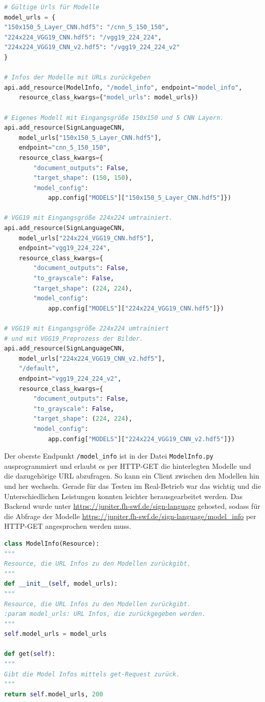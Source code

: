 \documentclass[11pt,bibliography=totocnumbered]{scrartcl}
\begin{document}
\begin{lstlisting}[language=python,firstnumber=6,caption={Anlegen der HTTP-Endpunkte.},label=lst:add_http_endpoints]
# Gültige Urls für Modelle
model_urls = {
"150x150_5_Layer_CNN.hdf5": "/cnn_5_150_150",
"224x224_VGG19_CNN.hdf5": "/vgg19_224_224",
"224x224_VGG19_CNN_v2.hdf5": "/vgg19_224_224_v2"
}

# Infos der Modelle mit URLs zurückgeben
api.add_resource(ModelInfo, "/model_info", endpoint="model_info", 
	resource_class_kwargs={"model_urls": model_urls})

# Eigenes Modell mit Eingangsgröße 150x150 und 5 CNN Layern.
api.add_resource(SignLanguageCNN, 
	model_urls["150x150_5_Layer_CNN.hdf5"], 
	endpoint="cnn_5_150_150",
	resource_class_kwargs={
		"document_outputs": False,
		"target_shape": (150, 150),
		"model_config": 
			app.config["MODELS"]["150x150_5_Layer_CNN.hdf5"]})

# VGG19 mit Eingangsgröße 224x224 umtrainiert.
api.add_resource(SignLanguageCNN, 
	model_urls["224x224_VGG19_CNN.hdf5"], 
	endpoint="vgg19_224_224",
	resource_class_kwargs={
		"document_outputs": False,
		"to_grayscale": False,
		"target_shape": (224, 224),
		"model_config": 
			app.config["MODELS"]["224x224_VGG19_CNN.hdf5"]})

# VGG19 mit Eingangsgröße 224x224 umtrainiert 
# und mit VGG19_Preprozess der Bilder.
api.add_resource(SignLanguageCNN, 
	model_urls["224x224_VGG19_CNN_v2.hdf5"], 
	"/default", 
	endpoint="vgg19_224_224_v2",
	resource_class_kwargs={
		"document_outputs": False,
		"to_grayscale": False,
		"target_shape": (224, 224),
		"model_config": 
			app.config["MODELS"]["224x224_VGG19_CNN_v2.hdf5"]})
\end{lstlisting}
Der oberste Endpunkt \lstinline[language=pythoninline]|/model_info| ist in der Datei \lstinline[language=pythoninline]|ModelInfo.py| ausprogrammiert und erlaubt es per HTTP-GET die hinterlegten Modelle und die dazugehörige URL abzufragen. So kann ein Client zwischen den Modellen hin und her wechseln. Gerade für das Testen im Real-Betrieb war das wichtig und die Unterschiedlichen Leistungen konnten leichter herausgearbeitet werden. Das Backend wurde unter \url{https://jupiter.fh-swf.de/sign-language} gehosted, sodass für die Abfrage der Modelle \url{https://jupiter.fh-swf.de/sign-language/model_info} per HTTP-GET angesprochen werden muss.
\begin{lstlisting}[language=python,firstnumber=4,caption={Abfrage der möglichen Modelle.},label=lst:request_models]
class ModelInfo(Resource):
"""
Resource, die URL Infos zu den Modellen zurückgibt.
"""
def __init__(self, model_urls):
"""
Resource, die URL Infos zu den Modellen zurückgibt.
:param model_urls: URL Infos, die zurückgegeben werden.
"""
self.model_urls = model_urls

def get(self):
"""
Gibt die Model Infos mittels get-Request zurück.
"""
return self.model_urls, 200
\end{lstlisting}
\end{document}
